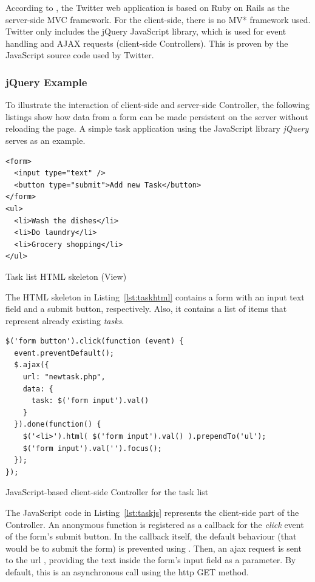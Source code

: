 According to , the Twitter web application is based on Ruby on Rails as the server-side MVC framework.
For the client-side, there is no MV* framework used. Twitter only includes the jQuery JavaScript library, which is used for event handling and AJAX requests (client-side Controllers). This is proven by the JavaScript source code used by Twitter.

\subsubsection{jQuery Example}
To illustrate the interaction of client-side and server-side Controller, the following listings show how data from a form can be made persistent on the server without reloading the page. A simple task application using the JavaScript library \emph{jQuery} serves as an example.

\begin{listing}[H]
\begin{verbatim}
<form>
  <input type="text" />
  <button type="submit">Add new Task</button>
</form>	
<ul>
  <li>Wash the dishes</li>
  <li>Do laundry</li>
  <li>Grocery shopping</li>
</ul>
\end{verbatim}
\caption{Task list HTML skeleton (View)}
\label{lst:taskhtml}
\end{listing}

The HTML skeleton in Listing~\ref{lst:taskhtml} contains a form with an input text field and a submit button, respectively. Also, it contains a list of items that represent already existing \emph{tasks}.

\begin{listing}[H]
\begin{verbatim}
$('form button').click(function (event) {
  event.preventDefault();
  $.ajax({
    url: "newtask.php",
    data: {
      task: $('form input').val()
    }
  }).done(function() {
    $('<li>').html( $('form input').val() ).prependTo('ul');
    $('form input').val('').focus();
  });
});
\end{verbatim}
\caption{JavaScript-based client-side Controller for the task list}
\label{lst:taskjs}
\end{listing}

The JavaScript code in Listing~\ref{lst:taskjs} represents the client-side part of the Controller. An anonymous function is registered as a callback for the \emph{click} event of the form's submit button. In the callback itself, the default behaviour (that would be to submit the form) is prevented using . Then, an \ac{ajax} request is sent to the \ac{url} , providing the text inside the form's input field as a parameter. By default, this is an asynchronous call using the \ac{http} GET method.

